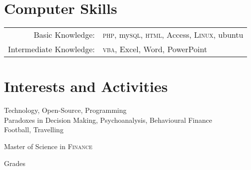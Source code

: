 \documentclass[a4paper,10pt]{article} %
\begin{document}
\section{Computer Skills}
\begin{tabular}{rl}

Basic Knowledge: & \textsc{php}, my\textsc{sql}, \textsc{html}, Access, \textsc{Linux}, ubuntu\\
Intermediate Knowledge: & \textsc{vba}, Excel, Word, PowerPoint\\

\end{tabular}
\section{Interests and Activities}

Technology, Open-Source, Programming\\
Paradoxes in Decision Making, Psychoanalysis, Behavioural Finance\\
Football, Travelling
\par{\centering\Large \hypertarget{grds}{Master of Science in \textsc{Finance}}\par}\large{\centering Grades\par}\normalsize
\end{document}
